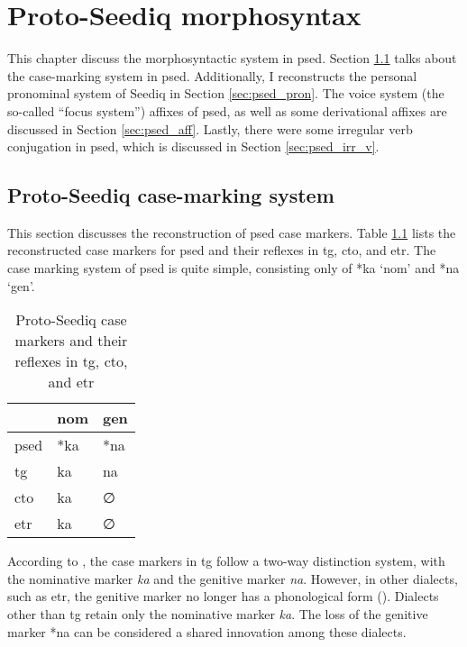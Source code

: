 \chapter{Proto-Seediq morphosyntax} \label{ch5}

This chapter discuss the morphosyntactic system in \acl{psed}. Section \ref{sec:psed_case} talks about the case-marking system in \acl{psed}. Additionally, I reconstructs the personal pronominal system of Seediq in Section \ref{sec:psed_pron}. The voice system (the so-called ``focus system'') affixes of \acl{psed}, as well as some derivational affixes are discussed in Section \ref{sec:psed_aff}. Lastly, there were some irregular verb conjugation in \acl{psed}, which is discussed in Section \ref{sec:psed_irr_v}.

\section{Proto-Seediq case-marking system} \label{sec:psed_case}

This section discusses the reconstruction of \acl{psed} case markers. Table \ref{tab:psed_case} lists the reconstructed case markers for \acl{psed} and their reflexes in \acl{tg}, \acl{cto}, and \acl{etr}. The case marking system of \acl{psed} is quite simple, consisting only of *ka `\acs{nom}' and *na `\acs{gen}'.

\begin{table}[!htbp]
\centering
\caption{Proto-Seediq case markers and their reflexes in \acl{tg}, \acl{cto}, and \acl{etr}}
\label{tab:psed_case}
\begin{tabular}{lll}
\hline
           & \ac{nom} & \ac{gen} \\ \hline
\acs{psed} & *ka      & *na      \\
\ac{tg}    & ka       & na       \\
\ac{cto}   & ka       & ∅        \\
\ac{etr}   & ka       & ∅        \\ \hline
\end{tabular}
\end{table}

According to \textcite{Sung2018Sedgrammar}, the case markers in \acl{tg} follow a two-way distinction system, with the nominative marker \textit{ka} and the genitive marker \textit{na}. However, in other dialects, such as \acl{etr}, the genitive marker no longer has a phonological form (\cite{Lee2018Trugrammar}). Dialects other than \acl{tg} retain only the nominative marker \textit{ka}. The loss of the genitive marker *na can be considered a shared innovation among these dialects. 


